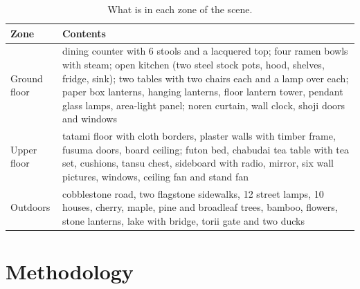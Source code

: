 \documentclass[10pt,a4paper]{article}
\begin{document}


\begin{table}[htbp]
\centering\small
\begin{tabular}{@{}p{2.4cm}p{13.5cm}@{}}
\toprule
\textbf{Zone} & \textbf{Contents}\\
\midrule
Ground floor & dining counter with 6 stools and a lacquered top; four ramen bowls with steam; open kitchen (two steel stock pots, hood, shelves, fridge, sink); two tables with two chairs each and a lamp over each; paper box lanterns, hanging lanterns, floor lantern tower, pendant glass lamps, area-light panel; noren curtain, wall clock, shoji doors and windows\\
Upper floor & tatami floor with cloth borders, plaster walls with timber frame, fusuma doors, board ceiling; futon bed, chabudai tea table with tea set, cushions, tansu chest, sideboard with radio, mirror, six wall pictures, windows, ceiling fan and stand fan\\
Outdoors & cobblestone road, two flagstone sidewalks, 12 street lamps, 10 houses, cherry, maple, pine and broadleaf trees, bamboo, flowers, stone lanterns, lake with bridge, torii gate and two ducks\\
\bottomrule
\end{tabular}
\caption{What is in each zone of the scene.}
\end{table}

\section{Methodology}
\end{document}
